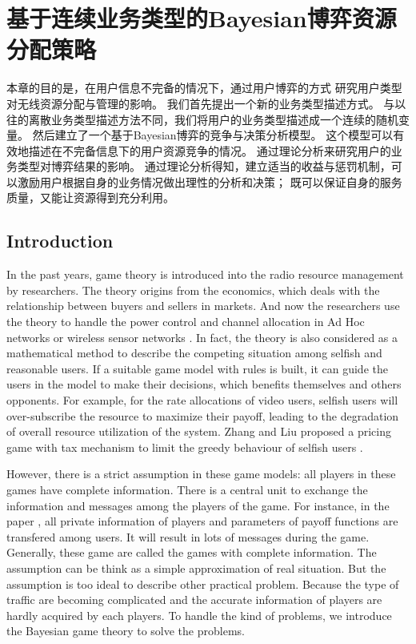 \graphicspath{ {../body/bayesian_figures/}}
\chapter{基于连续业务类型的Bayesian博弈资源分配策略}
\par 
本章的目的是，在用户信息不完备的情况下，通过用户博弈的方式
研究用户类型对无线资源分配与管理的影响。
我们首先提出一个新的业务类型描述方式。
与以往的离散业务类型描述方法不同，我们将用户的业务类型描述成一个连续的随机变量。
然后建立了一个基于Bayesian博弈的竞争与决策分析模型。
这个模型可以有效地描述在不完备信息下的用户资源竞争的情况。
通过理论分析来研究用户的业务类型对博弈结果的影响。
通过理论分析得知，建立适当的收益与惩罚机制，可以激励用户根据自身的业务情况做出理性的分析和决策；
既可以保证自身的服务质量，又能让资源得到充分利用。
%
\section{Introduction}
In the past years, game theory is introduced into the radio resource management by researchers. 
The theory origins from the economics, which deals with the relationship between buyers and sellers in markets.
And now the researchers use the theory to handle the power control and channel allocation in Ad Hoc networks or wireless sensor networks \cite{Srivastava:2005}\cite{FangBensaou2004}.
In fact, the theory is also considered as a mathematical method to describe the competing situation among selfish and reasonable users. 
If a suitable game model with rules is built, it can guide the users in the model to make their decisions, which benefits themselves and others opponents.
For example, for the rate allocations of video users, selfish users will over-subscribe the resource to maximize their payoff, leading to the degradation of overall resource utilization of the system. 
Zhang and Liu proposed a pricing game with tax mechanism to limit the greedy behaviour of selfish users \cite{ZhangLiu2011}.

However, there is a strict assumption in these game models: all players in these games have complete information. 
There is a central unit to exchange the information and messages among the players of the game.
For instance, in the paper \cite{ZhangLiu2011}, all private information of players and parameters of payoff functions are transfered among users. 
It will result in lots of messages during the game. 
Generally, these game are called the games with complete information.
The assumption can be think as a simple approximation of real situation. 
But the assumption is too ideal to describe other practical problem. 
Because the type of traffic are becoming complicated and  the accurate information of players are hardly acquired by each players.
To handle the kind of problems, we introduce the Bayesian game theory to solve the problems.



